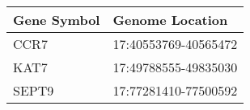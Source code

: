 \begin{tabular}{ll}
\toprule
Gene Symbol &      Genome Location \\
\midrule
       CCR7 & 17:40553769-40565472 \\
       KAT7 & 17:49788555-49835030 \\
      SEPT9 & 17:77281410-77500592 \\
\bottomrule
\end{tabular}

